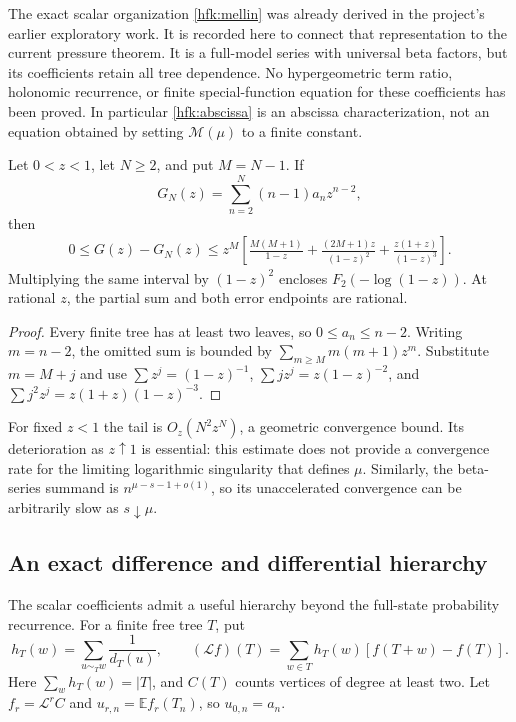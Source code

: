 The exact scalar organization \eqref{hfk:mellin} was already derived in
the project's earlier exploratory work. It is recorded here to connect
that representation to the current pressure theorem. It is a full-model
series with universal beta factors, but its coefficients retain all tree
dependence. No hypergeometric term ratio, holonomic recurrence, or finite
special-function equation for these coefficients has been proved.
In particular \eqref{hfk:abscissa} is an abscissa characterization, not an
equation obtained by setting $\mathcal M(\mu)$ to a finite constant.

\begin{proposition}
\label{hfk:fixed-z}
Let $0<z<1$, let $N\ge2$, and put $M=N-1$. If
\[
 G_N(z)=\sum_{n=2}^{N}(n-1)a_nz^{n-2},
\]
then
\begin{align*}
 0\le G(z)-G_N(z)
 \le z^M\left[
  \frac{M(M+1)}{1-z}
  +\frac{(2M+1)z}{(1-z)^2}
  +\frac{z(1+z)}{(1-z)^3}
 \right].
\end{align*}
Multiplying the same interval by $(1-z)^2$ encloses
$F_2(-\log(1-z))$. At rational $z$, the partial sum and both error
endpoints are rational.
\end{proposition}
\begin{proof}
Every finite tree has at least two leaves, so $0\le a_n\le n-2$.
Writing $m=n-2$, the omitted sum is bounded by
$\sum_{m\ge M}m(m+1)z^m$. Substitute $m=M+j$ and use
$\sum z^j=(1-z)^{-1}$,
$\sum jz^j=z(1-z)^{-2}$, and
$\sum j^2z^j=z(1+z)(1-z)^{-3}$.
\end{proof}

For fixed $z<1$ the tail is $O_z(N^2z^N)$, a geometric convergence
bound. Its deterioration as $z\uparrow1$ is essential: this estimate
does not provide a convergence rate for the limiting logarithmic
singularity that defines $\mu$. Similarly, the beta-series summand is
$n^{\mu-s-1+o(1)}$, so its unaccelerated convergence can be arbitrarily
slow as $s\downarrow\mu$.

\subsection{An exact difference and differential hierarchy}

The scalar coefficients admit a useful hierarchy beyond the full-state
probability recurrence. For a finite free tree $T$, put
\[
 h_T(w)=\sum_{u\sim_Tw}\frac1{d_T(u)},\qquad
 (\mathcal L f)(T)=\sum_{w\in T}h_T(w)[f(T+w)-f(T)].
\]
Here $\sum_wh_T(w)=|T|$, and $C(T)$ counts vertices of degree at
least two. Let $f_r=\mathcal L^r C$ and
$u_{r,n}=\mathbb E f_r(T_n)$, so $u_{0,n}=a_n$.

